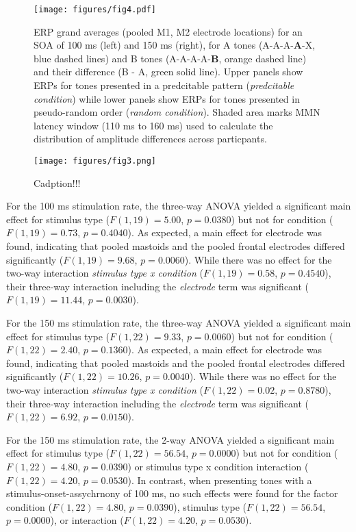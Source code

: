 \documentclass[stu,a4paper,11pt,floatsintext]{apa7}
\renewcommand{\includegraphics}[1]{
	\latexincludegraphics[width = \textwidth]{#1}
}
\begin{document}
\begin{figure}
\centering
\texttt{[image: figures/fig4.pdf]}
\caption{ERP grand averages (pooled M1, M2 electrode locations) for an
SOA of 100 ms (left) and 150 ms (right), for A tones
(A-A-A-\textbf{A}-X, blue dashed lines) and B tones (A-A-A-A-\textbf{B},
orange dashed line) and their difference (B - A, green solid line).
Upper panels show ERPs for tones presented in a predcitable pattern
(\emph{predcitable condition}) while lower panels show ERPs for tones
presented in pseudo-random order (\emph{random condition}). Shaded area
marks MMN latency window (110 ms to 160 ms) used to calculate the
distribution of amplitude differences across particpants.}
\end{figure}

\begin{figure}
\centering
\texttt{[image: figures/fig3.png]}
\caption{Cadption!!!}
\end{figure}

For the 100 ms stimulation rate, the three-way ANOVA yielded a
significant main effect for stimulus type (\(F(1,19) = 5.00\),
\(p = 0.0380\)) but not for condition (\(F(1,19) = 0.73\),
\(p = 0.4040\)). As expected, a main effect for electrode was found,
indicating that pooled mastoids and the pooled frontal electrodes
differed significantly (\(F(1,19) = 9.68\), \(p = 0.0060\)). While there
was no effect for the two-way interaction \emph{stimulus type x
condition} (\(F(1,19) = 0.58\), \(p = 0.4540\)), their three-way
interaction including the \emph{electrode} term was significant
(\(F(1,19) = 11.44\), \(p = 0.0030\)).

For the 150 ms stimulation rate, the three-way ANOVA yielded a
significant main effect for stimulus type (\(F(1,22) = 9.33\),
\(p = 0.0060\)) but not for condition (\(F(1,22) = 2.40\),
\(p = 0.1360\)). As expected, a main effect for electrode was found,
indicating that pooled mastoids and the pooled frontal electrodes
differed significantly (\(F(1,22) = 10.26\), \(p = 0.0040\)). While
there was no effect for the two-way interaction \emph{stimulus type x
condition} (\(F(1,22) = 0.02\), \(p = 0.8780\)), their three-way
interaction including the \emph{electrode} term was significant
(\(F(1,22) = 6.92\), \(p = 0.0150\)).

For the 150 ms stimulation rate, the 2-way ANOVA yielded a significant
main effect for stimulus type (\(F(1,22) = 56.54\), \(p = 0.0000\)) but
not for condition (\(F(1,22) = 4.80\), \(p = 0.0390\)) or stimulus type
x condition interaction (\(F(1,22) = 4.20\), \(p = 0.0530\)). In
contrast, when presenting tones with a stimulus-onset-assychrnony of 100
ms, no such effects were found for the factor condition
(\(F(1,22) = 4.80\), \(p = 0.0390\)), stimulus type
(\(F(1,22) = 56.54\), \(p = 0.0000\)), or interaction
(\(F(1,22) = 4.20\), \(p = 0.0530\)).
\end{document}
